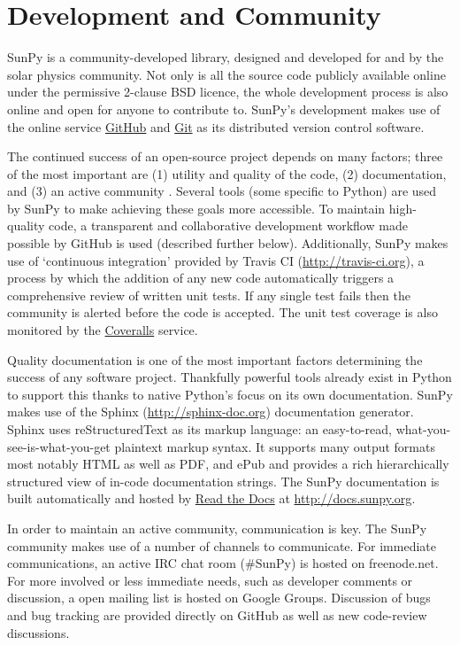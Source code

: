 \section{Development and Community}\label{sec:dev}
SunPy is a community-developed library, designed and developed for and by 
the solar physics community. Not only is all the source code publicly available 
online under the permissive 2-clause BSD licence, the whole 
development process is also online and open for anyone to contribute to.
SunPy's development makes use of the online service 
\href{http://github.com}{GitHub} and \href{http://git-scm.com/}{Git}
as its distributed version control software. 

The continued success of an open-source project depends on many factors;
three of the most important are (1) utility and quality of the code, (2) documentation, and (3) an
active community \cite{bangerth2013}. Several tools (some specific to Python) are used by
SunPy to make achieving these goals more accessible. To maintain high-quality code, a 
transparent and collaborative development workflow made possible by GitHub is used (described
further below).
Additionally, SunPy makes use of `continuous integration' provided by
Travis CI (\url{http://travis-ci.org}), a process by which the addition of any new code 
automatically triggers a comprehensive review of written unit tests. If any single test
fails then the community is alerted before the code is accepted. The unit test coverage is
also monitored by the \href{http://coveralls.io}{Coveralls} service.

Quality documentation is
one of the most important factors determining the success of any software project. 
Thankfully powerful tools already exist in Python to support this thanks to native
Python's focus on its own documentation. SunPy makes use of the Sphinx (\url{http://sphinx-doc.org})
documentation generator. Sphinx uses reStructuredText as its markup language: 
an easy-to-read, what-you-see-is-what-you-get plaintext markup syntax. It supports
many output formats most notably HTML as well as PDF, and ePub and provides a rich
hierarchically structured view of in-code documentation strings. The SunPy documentation 
is built automatically and hosted by \href{http://readthedocs.org}{Read the 
Docs} at \url{http://docs.sunpy.org}. 

In order to maintain an active community, communication is key.  The SunPy community makes
use of a number of channels to communicate. For immediate communications, an active IRC chat
room (\#SunPy) is hosted on freenode.net. For more involved or less immediate needs, such as
developer comments or discussion, a open mailing list is hosted on Google Groups. 
Discussion of bugs and bug tracking are provided directly on GitHub as well as new
code-review discussions.

